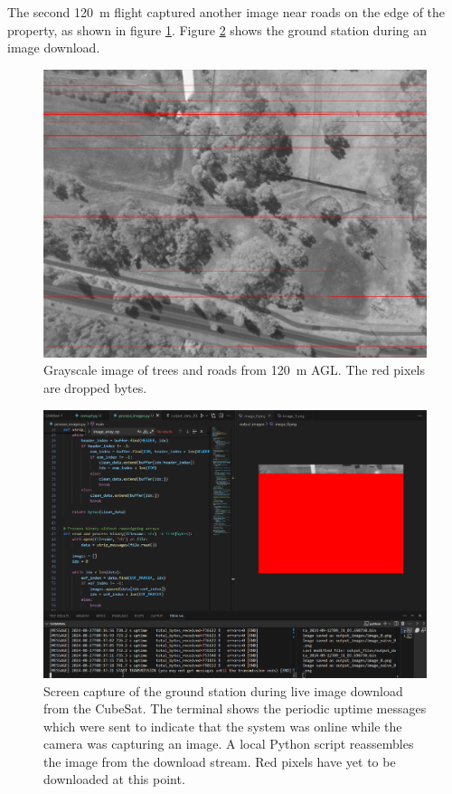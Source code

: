 \documentclass[]{report}
\begin{document}
The second \SI{120}{\metre} flight captured another image near roads on the edge of the property, as shown in figure \ref{fig:road-received}. Figure \ref{fig:live-image-reception} shows the ground station during an image download.

\begin{figure}[H]
  \centering
  \includegraphics[width=\linewidth]{images/road_received.png}
  \caption{Grayscale image of trees and roads from \SI{120}{\metre} AGL. The red pixels are dropped bytes.}
  \label{fig:road-received}
\end{figure}

\begin{figure}[H]
  \centering
  \includegraphics[width=\linewidth]{images/3rd_drone_test_live_reception.png}
  \caption{Screen capture of the ground station during live image download from the CubeSat. The terminal shows the periodic uptime messages which were sent to indicate that the system was online while the camera was capturing an image. A local Python script reassembles the image from the download stream. Red pixels have yet to be downloaded at this point.}
  \label{fig:live-image-reception}
\end{figure}
\end{document}
